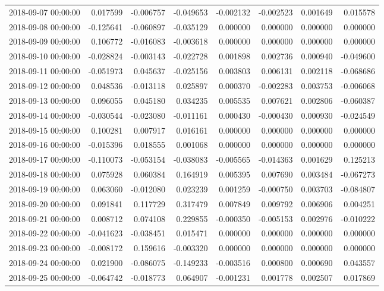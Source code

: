 \begin{tabular}{lrrrrrrr}
2018-09-07 00:00:00 & 0.017599 & -0.006757 & -0.049653 & -0.002132 & -0.002523 & 0.001649 & 0.015578 \\
2018-09-08 00:00:00 & -0.125641 & -0.060897 & -0.035129 & 0.000000 & 0.000000 & 0.000000 & 0.000000 \\
2018-09-09 00:00:00 & 0.106772 & -0.016083 & -0.003618 & 0.000000 & 0.000000 & 0.000000 & 0.000000 \\
2018-09-10 00:00:00 & -0.028824 & -0.003143 & -0.022728 & 0.001898 & 0.002736 & 0.000940 & -0.049600 \\
2018-09-11 00:00:00 & -0.051973 & 0.045637 & -0.025156 & 0.003803 & 0.006131 & 0.002118 & -0.068686 \\
2018-09-12 00:00:00 & 0.048536 & -0.013118 & 0.025897 & 0.000370 & -0.002283 & 0.003753 & -0.006068 \\
2018-09-13 00:00:00 & 0.096055 & 0.045180 & 0.034235 & 0.005535 & 0.007621 & 0.002806 & -0.060387 \\
2018-09-14 00:00:00 & -0.030544 & -0.023080 & -0.011161 & 0.000430 & -0.000430 & 0.000930 & -0.024549 \\
2018-09-15 00:00:00 & 0.100281 & 0.007917 & 0.016161 & 0.000000 & 0.000000 & 0.000000 & 0.000000 \\
2018-09-16 00:00:00 & -0.015396 & 0.018555 & 0.001068 & 0.000000 & 0.000000 & 0.000000 & 0.000000 \\
2018-09-17 00:00:00 & -0.110073 & -0.053154 & -0.038083 & -0.005565 & -0.014363 & 0.001629 & 0.125213 \\
2018-09-18 00:00:00 & 0.075928 & 0.060384 & 0.164919 & 0.005395 & 0.007690 & 0.003484 & -0.067273 \\
2018-09-19 00:00:00 & 0.063060 & -0.012080 & 0.023239 & 0.001259 & -0.000750 & 0.003703 & -0.084807 \\
2018-09-20 00:00:00 & 0.091841 & 0.117729 & 0.317479 & 0.007849 & 0.009792 & 0.006906 & 0.004251 \\
2018-09-21 00:00:00 & 0.008712 & 0.074108 & 0.229855 & -0.000350 & -0.005153 & 0.002976 & -0.010222 \\
2018-09-22 00:00:00 & -0.041623 & -0.038451 & 0.015471 & 0.000000 & 0.000000 & 0.000000 & 0.000000 \\
2018-09-23 00:00:00 & -0.008172 & 0.159616 & -0.003320 & 0.000000 & 0.000000 & 0.000000 & 0.000000 \\
2018-09-24 00:00:00 & 0.021900 & -0.086075 & -0.149233 & -0.003516 & 0.000800 & 0.000690 & 0.043557 \\
2018-09-25 00:00:00 & -0.064742 & -0.018773 & 0.064907 & -0.001231 & 0.001778 & 0.002507 & 0.017869 \\

\end{tabular}
